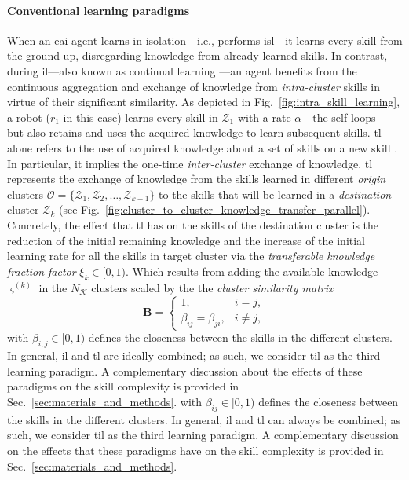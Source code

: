 \documentclass[12pt]{article}
\renewcommand{\emph}[1]{\textit{#1}}
\begin{document}
\paragraph*{Conventional learning paradigms} 
When an \ac{eai} agent learns in isolation---i.e., performs \ac{isl}---it learns every skill from the ground up, disregarding knowledge from already learned skills. In contrast, during \ac{il}---also known as continual learning \cite{Lesort2020Continuallearningrobotics}---an agent benefits from the continuous aggregation and exchange of knowledge from \emph{intra-cluster} skills in virtue of their significant similarity. As depicted in Fig.~\ref{fig:intra_skill_learning}, a robot ($r_1$ in this case) learns every skill in $\mathcal{Z}_1$ with a rate $\alpha$---the self-loops---but also retains and uses the acquired knowledge to learn subsequent skills. \Ac{tl} alone refers to the use of acquired knowledge about a set of skills on a new skill \cite{Hosna2022Transferlearningfriendly,Jaquier2023TransferLearningRobotics}. In particular, it implies the one-time \emph{inter-cluster} exchange of knowledge. \Ac{tl} represents the exchange of knowledge from the skills learned in different \emph{origin} clusters $\mathcal{O} = \{ \mathcal{Z}_1,\mathcal{Z}_2,\ldots,\mathcal{Z}_{k-1} \}$ to the skills that will be learned in a \emph{destination} cluster $\mathcal{Z}_k$ (see Fig.~\ref{fig:cluster_to_cluster_knowledge_transfer_parallel}). Concretely, the effect that \ac{tl} has on the skills of the destination cluster is the reduction of the initial remaining knowledge and the increase of the initial learning rate for all the skills in target cluster via the \emph{transferable knowledge fraction factor} $\xi_k \in [0,1)$. Which results from adding the available knowledge $\varsigma^{(k)}$ in the $N_\mathcal{K}$ clusters scaled by the the \emph{cluster similarity matrix}
\begin{equation}\label{eq:cluster_similarity_matrix}
	\bm{B}=\begin{cases}
		1, & i=j, \\
		\beta_{ij} = \beta_{ji}, & i \neq j,
	\end{cases}
\end{equation}
with $\beta_{i,j} \in [0,1)$ defines the closeness between the skills in the different clusters. In general, \ac{il} and \ac{tl} are ideally combined; as such, we consider \ac{til} as the third learning paradigm. A complementary discussion about the effects of these paradigms on the skill complexity is provided in Sec.~\ref{sec:materials_and_methods}.
with $\beta_{ij} \in [0,1)$ defines the closeness between the skills in the different clusters. In general, \ac{il} and \ac{tl} can always be combined; as such, we consider \ac{til} as the third learning paradigm. A complementary discussion on the effects that these paradigms have on the skill complexity is provided in Sec.~\ref{sec:materials_and_methods}.
\end{document}

